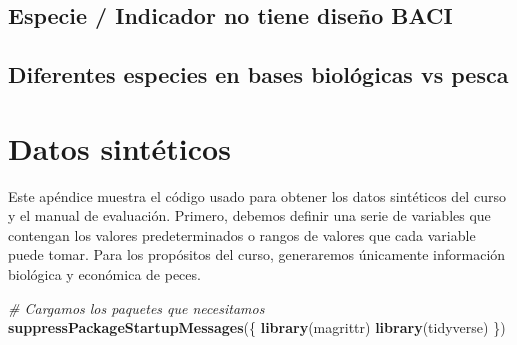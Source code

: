 \documentclass[]{krantz}
\makeatletter
\newenvironment{Shaded}{\begin{snugshade}}{\end{snugshade}}
\newcommand{\CommentTok}[1]{\textcolor[rgb]{0.56,0.35,0.01}{\textit{#1}}}
\newcommand{\KeywordTok}[1]{\textcolor[rgb]{0.13,0.29,0.53}{\textbf{#1}}}
\newcommand{\NormalTok}[1]{#1}
\newenvironment{kframe}{%
\medskip{}
\setlength{\fboxsep}{.8em}
 \def\at@end@of@kframe{}%
 \ifinner\ifhmode%
  \def\at@end@of@kframe{\end{minipage}}%
  \begin{minipage}{\columnwidth}%
 \fi\fi%
 \def\FrameCommand##1{\hskip\@totalleftmargin \hskip-\fboxsep
 \colorbox{shadecolor}{##1}\hskip-\fboxsep
     \hskip-\linewidth \hskip-\@totalleftmargin \hskip\columnwidth}%
 \MakeFramed {\advance\hsize-\width
   \@totalleftmargin\z@ \linewidth\hsize
   \@setminipage}}%
 {\par\unskip\endMakeFramed%
 \at@end@of@kframe}
\renewenvironment{Shaded}{\begin{kframe}}{\end{kframe}}
\makeatother
\begin{document}
\hypertarget{especie-indicador-no-tiene-diseno-baci}{%
\section{Especie / Indicador no tiene diseño
BACI}\label{especie-indicador-no-tiene-diseno-baci}}

\hypertarget{diferentes-especies-en-bases-biologicas-vs-pesca}{%
\section{Diferentes especies en bases biológicas vs
pesca}\label{diferentes-especies-en-bases-biologicas-vs-pesca}}

\hypertarget{appendix-appendice}{%
\appendix {}}


\hypertarget{datos-sinteticos}{%
\chapter{Datos sintéticos}\label{datos-sinteticos}}

Este apéndice muestra el código usado para obtener los datos sintéticos
del curso y el manual de evaluación. Primero, debemos definir una serie
de variables que contengan los valores predeterminados o rangos de
valores que cada variable puede tomar. Para los propósitos del curso,
generaremos únicamente información biológica y económica de peces.

\begin{Shaded}
\begin{Highlighting}[]
\CommentTok{# Cargamos los paquetes que necesitamos}
\KeywordTok{suppressPackageStartupMessages}\NormalTok{(\{}
  \KeywordTok{library}\NormalTok{(magrittr)}
  \KeywordTok{library}\NormalTok{(tidyverse)}
\NormalTok{\})}
\end{Highlighting}
\end{Shaded}
\end{document}
